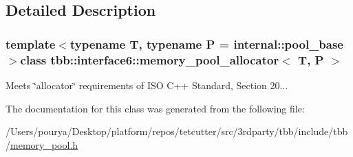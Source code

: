 \subsection{Detailed Description}
\subsubsection*{template$<$typename T, typename P = internal\+::pool\+\_\+base$>$class tbb\+::interface6\+::memory\+\_\+pool\+\_\+allocator$<$ T, P $>$}

Meets \char`\"{}allocator\char`\"{} requirements of I\+S\+O C++ Standard, Section 20... 



The documentation for this class was generated from the following file\+:\begin{DoxyCompactItemize}
\item 
/\+Users/pourya/\+Desktop/platform/repos/tetcutter/src/3rdparty/tbb/include/tbb/\hyperlink{memory__pool_8h}{memory\+\_\+pool.\+h}\end{DoxyCompactItemize}
